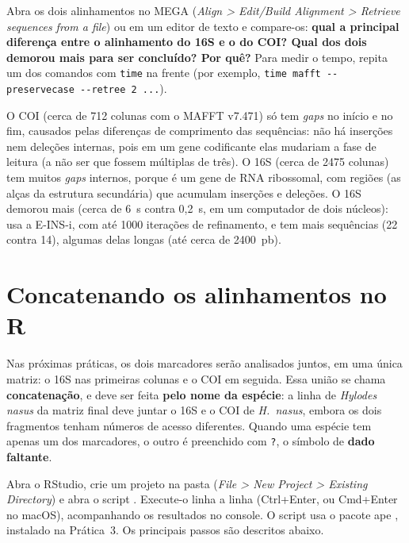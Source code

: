 \documentclass[11pt,a4paper]{article}
\newcommand{\arq}[1]{\path{#1}}
\newcommand{\ui}[1]{\textit{#1}}
\newcommand{\tecla}[1]{\textsf{#1}}
\begin{document}
Abra os dois alinhamentos no MEGA (\ui{Align > Edit/Build Alignment > Retrieve sequences from
a file}) ou em um editor de texto e compare-os: \textbf{qual a principal diferença entre o
alinhamento do 16S e o do COI? Qual dos dois demorou mais para ser concluído? Por quê?}
Para medir o tempo, repita um dos comandos com \verb|time| na frente (por exemplo,
\verb|time mafft --preservecase --retree 2 ...|).

\begin{resposta}
O COI (cerca de 712 colunas com o MAFFT v7.471) só tem \emph{gaps} no início e no fim,
causados pelas diferenças de comprimento das sequências: não há inserções nem deleções
internas, pois em um gene codificante elas mudariam a fase de leitura (a não ser que fossem
múltiplas de três). O 16S (cerca de 2475 colunas) tem muitos \emph{gaps} internos, porque é
um gene de RNA ribossomal, com regiões (as alças da estrutura secundária) que acumulam
inserções e deleções. O 16S demorou mais (cerca de 6~s contra 0,2~s, em um computador de dois
núcleos): usa a E-INS-i, com até 1000 iterações de refinamento, e tem mais sequências (22
contra 14), algumas delas longas (até cerca de 2400~pb).
\end{resposta}

\section{Concatenando os alinhamentos no R}\label{sec:concatenar}

Nas próximas práticas, os dois marcadores serão analisados juntos, em uma única matriz: o 16S
nas primeiras colunas e o COI em seguida. Essa união se chama \textbf{concatenação}, e deve
ser feita \textbf{pelo nome da espécie}: a linha de \emph{Hylodes nasus} da matriz final deve
juntar o 16S e o COI de \emph{H.~nasus}, embora os dois fragmentos tenham números de acesso
diferentes. Quando uma espécie tem apenas um dos marcadores, o outro é preenchido com
\verb|?|, o símbolo de \textbf{dado faltante}.

Abra o RStudio, crie um projeto na pasta \arq{pratica_alinhamento} (\ui{File > New Project >
Existing Directory}) e abra o script \arq{R/04_concatenar.R}. Execute-o linha a linha
(\tecla{Ctrl+Enter}, ou \tecla{Cmd+Enter} no macOS), acompanhando os resultados no console.
O script usa o pacote ape \cite{paradis2019}, instalado na Prática~3. Os principais passos
são descritos abaixo.
\end{document}
